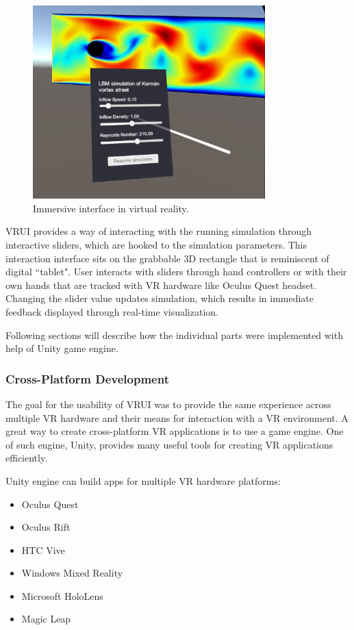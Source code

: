 \begin{figure}[!ht]
	\centering
	\includegraphics[width=0.8\textwidth]{figures/unity-vr-ui.jpeg}
	\caption{Immersive interface in virtual reality.}
	\label{fig:unity-vr-ui}
\end{figure}

VRUI provides a way of interacting with the running simulation through interactive sliders, which are hooked to the simulation parameters. This interaction interface sits on the grabbable 3D rectangle that is reminiscent of digital ``tablet". User interacts with sliders through hand controllers or with their own hands that are tracked with VR hardware like Oculus Quest headset. Changing the slider value updates simulation, which results in immediate feedback displayed through real-time visualization.

Following sections will describe how the individual parts were implemented with help of Unity game engine.

\subsubsection{Cross-Platform Development}
The goal for the usability of VRUI was to provide the same experience across multiple VR hardware and their means for interaction with a VR environment. A great way to create cross-platform VR applications is to use a game engine. One of such engine, Unity, provides many useful tools for creating VR applications efficiently.

Unity engine can build apps for multiple VR hardware platforms:

\begin{itemize}
	\item Oculus Quest
	\item Oculus Rift
	\item HTC Vive
	\item Windows Mixed Reality
	\item Microsoft HoloLens
	\item Magic Leap
\end{itemize}

